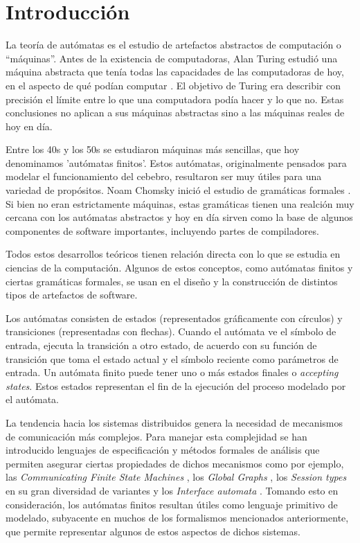 \section{Introducción}
La teoría de autómatas es el estudio de artefactos abstractos de computación o ``máquinas''. Antes de la existencia de computadoras, Alan Turing estudió una máquina abstracta que tenía todas las capacidades de las computadoras de hoy, en el aspecto de qué podían computar \cite{turing:plms-s2-42_1,turing:plms-s2-43_1}. El objetivo de Turing era describir con precisión el límite entre lo que una computadora podía hacer y lo que no. Estas conclusiones no aplican a sus máquinas abstractas sino a las máquinas reales de hoy en día.

Entre los 40s y los 50s se estudiaron máquinas más sencillas, que hoy denominamos 'autómatas finitos'. Estos autómatas, originalmente pensados para modelar el funcionamiento del cebebro, resultaron ser muy útiles para una variedad de propósitos. Noam Chomsky inició el estudio de gramáticas formales \cite{chomsky:iretit-2_3}. Si bien no eran estrictamente máquinas, estas gramáticas tienen una realción muy cercana con los autómatas abstractos y hoy en día sirven como la base de algunos componentes de software importantes, incluyendo partes de compiladores.

Todos estos desarrollos teóricos tienen relación directa con lo que se estudia en ciencias de la computación. Algunos de estos conceptos, como autómatas finitos y ciertas gramáticas formales, se usan en el diseño y la construcción de distintos tipos de artefactos de software.

Los autómatas consisten de estados (representados gráficamente con círculos) y transiciones (representadas con flechas). Cuando el autómata ve el símbolo de entrada, ejecuta la transición a otro estado, de acuerdo con su función de transición que toma el estado actual y el símbolo reciente como parámetros de entrada. Un autómata finito puede tener uno o más estados finales o \emph{accepting states}. Estos estados representan el fin de la ejecución del proceso modelado por el autómata.

La tendencia hacia los sistemas distribuidos genera la necesidad de mecanismos de comunicación más complejos. Para manejar esta complejidad se han introducido lenguajes de especificación y métodos formales de análisis que permiten asegurar ciertas propiedades de dichos mecanismos como por ejemplo, las \emph{Communicating Finite State Machines} \cite{CFSM}, los \emph{Global Graphs} \cite{castagna:lmcs-8_1}, los \emph{Session types} en su gran diversidad de variantes \cite{honda:esop98,honda:popl08} y los \emph{Interface automata} \cite{dealfaro:esec-fse-01}. Tomando esto en consideración, los autómatas finitos resultan útiles como lenguaje primitivo de modelado, subyacente en muchos de los formalismos mencionados anteriormente, que permite representar algunos de estos aspectos de dichos sistemas.

